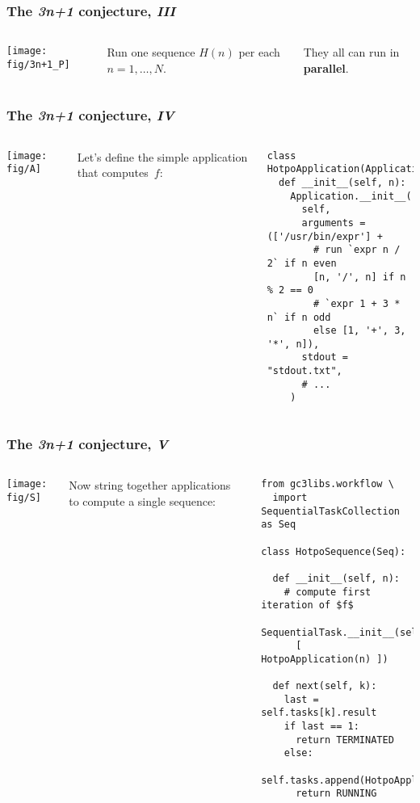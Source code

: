 \documentclass[english,serif,mathserif,xcolor=pdftex,dvipsnames,table]{beamer}
\begin{document}
\begin{frame}
  \frametitle{The \emph{3n+1} conjecture, \emph{III}}
  \label{sec:7c}

  \+
  \begin{columns}[c]
    \texttt{[image: fig/3n+1\_P]}

    Run one sequence $H(n)$ per each $n = 1, \ldots, N$.

    \+
    They all can run in \textbf{parallel}.
  \end{columns}
\end{frame}

\begin{frame}[fragile]
  \frametitle{The \emph{3n+1} conjecture, \emph{IV}}
  \label{sec:10}

  \begin{columns}
    \begin{center}
      \texttt{[image: fig/A]}
    \end{center}

    Let's define the simple application that computes~$f$:
    \begin{lstlisting}
class HotpoApplication(Application):
  def __init__(self, n):
    Application.__init__(
      self,
      arguments = (['/usr/bin/expr'] +
        # run `expr n / 2` if n even
        [n, '/', n] if n % 2 == 0
        # `expr 1 + 3 * n` if n odd
        else [1, '+', 3, '*', n]),
      stdout = "stdout.txt",
      # ...
    )
    \end{lstlisting}
  \end{columns}
\end{frame}

\begin{frame}[fragile]
  \frametitle{The \emph{3n+1} conjecture, \emph{V}}
  \label{sec:14}

  \begin{columns}
    \begin{center}
      \texttt{[image: fig/S]}
    \end{center}

    \small
    Now string together applications to compute a
    single sequence:
    \begin{lstlisting}[basicstyle=\ttfamily\footnotesize]
from gc3libs.workflow \
  import SequentialTaskCollection as Seq

class HotpoSequence(Seq):

  def __init__(self, n):
    # compute first iteration of $f$
    SequentialTask.__init__(self,
      [ HotpoApplication(n) ])

  def next(self, k):
    last = self.tasks[k].result
    if last == 1:
      return TERMINATED
    else:
      self.tasks.append(HotpoApplication(last))
      return RUNNING
    \end{lstlisting}
  \end{columns}
\end{frame}
\end{document}
